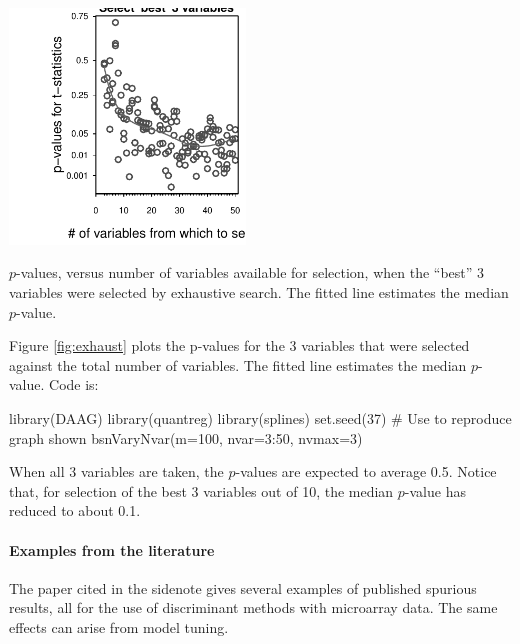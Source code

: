 \documentclass{tufte-book}\usepackage[]{graphicx}\usepackage[]{color}
\begin{document}
\begin{marginfigure}
\begin{Schunk}


\centerline{\includegraphics[width=0.47\textwidth]{figs/11-bsnVary-1} }

\end{Schunk}
\caption{$p$-values, versus number of variables available for selection,
  when the ``best'' 3 variables were selected by exhaustive search.
  The fitted line estimates the median $p$-value.\label{fig:exhaust}}
\end{marginfigure}
\noindent

Figure \ref{fig:exhaust} plots the p-values for the 3 variables that
were selected against the total number of variables. The fitted line
estimates the median $p$-value.
Code is:
\begin{Schunk}
\begin{Sinput}
library(DAAG)
library(quantreg)
library(splines)
set.seed(37)   # Use to reproduce graph shown
bsnVaryNvar(m=100, nvar=3:50, nvmax=3)
\end{Sinput}
\end{Schunk}

When all 3 variables are taken, the $p$-values are expected to average
0.5.  Notice that, for selection of the best 3 variables out of 10,
the median $p$-value has reduced to about 0.1.

\paragraph{Examples from the literature}

The paper cited in the sidenote gives
several examples of published spurious results, all for the use of
discriminant methods with microarray data.  The same effects can arise
from model tuning.
\end{document}
